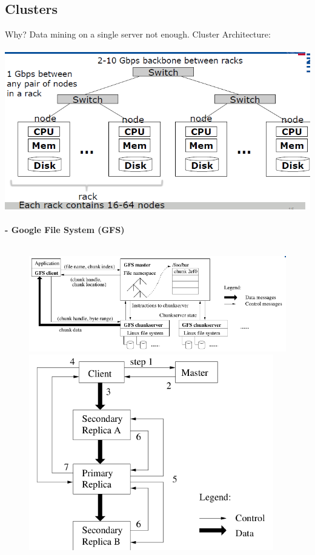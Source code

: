 \documentclass{article}
\begin{document}
\subsection{Clusters}
Why? Data mining on a single server not enough. Cluster Architecture:\\\\
\includegraphics[scale=0.6]{36.png}\\\\
\textbf{- Google File System (GFS)}\\\\
\begin{figure}[h!]
\includegraphics[scale=0.6]{37.png}
\includegraphics[scale=0.6]{38.png}
\end{figure}
\end{document}
